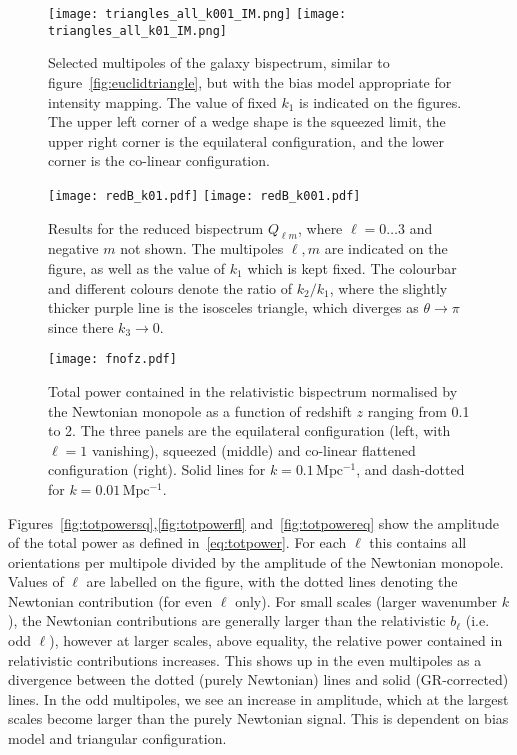 {\clearpage
\begin{figure}[H]
	\centering
	\texttt{[image: triangles\_all\_k001\_IM.png]}
	\texttt{[image: triangles\_all\_k01\_IM.png]} 
	\caption{Selected multipoles of the galaxy bispectrum, similar to figure~\ref{fig:euclidtriangle}, but with the bias model appropriate for intensity mapping. The value of fixed \(k_1\) is indicated on the figures. The upper left corner of a wedge shape is the squeezed limit, the upper right corner is the equilateral configuration, and the lower corner is the co-linear configuration. \label{fig:imtriangle}}
\end{figure}

\clearpage
\begin{figure}[H]
	\centering
	\texttt{[image: redB\_k01.pdf]}
	\texttt{[image: redB\_k001.pdf]}
	\caption{Results for the reduced bispectrum \(Q_{\ell m}\), where \(\ell = 0 \ldots 3\) and negative \(m\) not shown. The multipoles \(\ell,m\) are indicated on the figure, as well as the value of \(k_1\) which is kept fixed. The colourbar and different colours denote the ratio of \(k_2/k_1\), where the slightly thicker purple line is the isosceles triangle, which diverges as \(\theta\to\pi\) since there \(k_3\to 0\). \label{fig:Q_rb}}
\end{figure}

\clearpage
\begin{figure}[H]
\centering
\texttt{[image: fnofz.pdf]}
\caption{Total power contained in the relativistic bispectrum normalised by the Newtonian monopole as a function of redshift \(z\) ranging from 0.1 to 2. The three panels are the equilateral configuration (left, with \(\ell = 1\) vanishing), squeezed (middle) and co-linear flattened configuration (right). Solid lines for \(k = 0.1 \, \mathrm{Mpc^{-1}}\), and dash-dotted for \(k = 0.01 \, \mathrm{Mpc^{-1}}\).\label{fig:fnofz}}
\end{figure}

Figures~\ref{fig:totpowersq},\ref{fig:totpowerfl} and~\ref{fig:totpowereq} show the amplitude of the total power as defined in~\eqref{eq:totpower}. For each $\ell$ this contains all orientations per multipole divided by the amplitude of the Newtonian monopole. Values of \(\ell\) are labelled on the figure, with the dotted lines denoting the Newtonian contribution (for even \(\ell\) only). For small scales (larger wavenumber \(k\)), the Newtonian contributions are generally larger than the relativistic \(b_\ell\) (i.e. odd \(\ell\)), however at larger scales,  above equality, the relative power contained in relativistic contributions increases. This shows up in the even multipoles as a divergence between the dotted (purely Newtonian) lines and solid (GR-corrected) lines. In the odd multipoles, we see an increase in amplitude, which at the largest scales become larger than the purely Newtonian signal. This is dependent on bias model and triangular configuration.

}
